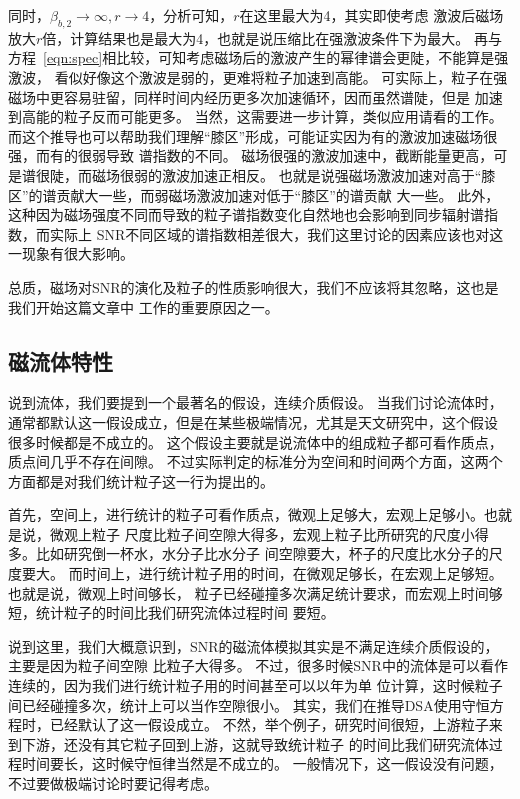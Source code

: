 同时，$\beta_{b,2}\to \infty, r\to4$，分析可知，$r$在这里最大为4，其实即使考虑
激波后磁场放大$r$倍，计算结果也是最大为4，也就是说压缩比在强激波条件下为最大。
再与方程~\ref{eqn:spec}相比较，可知考虑磁场后的激波产生的幂律谱会更陡，不能算是强激波，
看似好像这个激波是弱的，更难将粒子加速到高能。
可实际上，粒子在强磁场中更容易驻留，同样时间内经历更多次加速循环，因而虽然谱陡，但是
加速到高能的粒子反而可能更多。
当然，这需要进一步计算，类似应用请看\citet{Zirakashvili2018}的工作。
而这个推导也可以帮助我们理解“膝区”形成，可能证实因为有的激波加速磁场很强，而有的很弱导致
谱指数的不同。
磁场很强的激波加速中，截断能量更高，可是谱很陡，而磁场很弱的激波加速正相反。
也就是说强磁场激波加速对高于“膝区”的谱贡献大一些，而弱磁场激波加速对低于“膝区”的谱贡献
大一些。
此外，这种因为磁场强度不同而导致的粒子谱指数变化自然地也会影响到同步辐射谱指数，而实际上
SNR不同区域的谱指数相差很大\citep{Leahy2005, Tian2005}，我们这里讨论的因素应该也对这
一现象有很大影响。

总质，磁场对SNR的演化及粒子的性质影响很大，我们不应该将其忽略，这也是我们开始这篇文章中
工作的重要原因之一。

\subsection{磁流体特性}
说到流体，我们要提到一个最著名的假设，连续介质假设。
当我们讨论流体时，通常都默认这一假设成立，但是在某些极端情况，尤其是天文研究中，这个假设
很多时候都是不成立的。
这个假设主要就是说流体中的组成粒子都可看作质点，质点间几乎不存在间隙。
不过实际判定的标准分为空间和时间两个方面，这两个方面都是对我们统计粒子这一行为提出的。

首先，空间上，进行统计的粒子可看作质点，微观上足够大，宏观上足够小。也就是说，微观上粒子
尺度比粒子间空隙大得多，宏观上粒子比所研究的尺度小得多。比如研究倒一杯水，水分子比水分子
间空隙要大，杯子的尺度比水分子的尺度要大。
而时间上，进行统计粒子用的时间，在微观足够长，在宏观上足够短。也就是说，微观上时间够长，
粒子已经碰撞多次满足统计要求，而宏观上时间够短，统计粒子的时间比我们研究流体过程时间
要短。

说到这里，我们大概意识到，SNR的磁流体模拟其实是不满足连续介质假设的，主要是因为粒子间空隙
比粒子大得多。
不过，很多时候SNR中的流体是可以看作连续的，因为我们进行统计粒子用的时间甚至可以以年为单
位计算，这时候粒子间已经碰撞多次，统计上可以当作空隙很小。
其实，我们在推导DSA使用守恒方程时，已经默认了这一假设成立。
不然，举个例子，研究时间很短，上游粒子来到下游，还没有其它粒子回到上游，这就导致统计粒子
的时间比我们研究流体过程时间要长，这时候守恒律当然是不成立的。
一般情况下，这一假设没有问题，不过要做极端讨论时要记得考虑。

